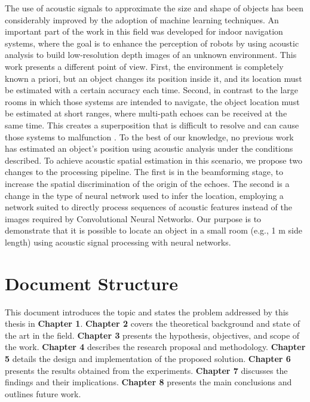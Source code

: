 The use of acoustic signals to approximate the size and shape of objects has been considerably improved by the adoption of machine learning techniques. An important part of the work in this field was developed for indoor navigation systems, where the goal is to enhance the perception of robots by using acoustic analysis to build low-resolution depth images of an unknown environment. This work presents a different point of view. First, the environment is completely known a priori, but an object changes its position inside it, and its location must be estimated with a certain accuracy each time. Second, in contrast to the large rooms in which those systems are intended to navigate, the object location must be estimated at short ranges, where multi-path echoes can be received at the same time. This creates a superposition that is difficult to resolve and can cause those systems to malfunction \cite{bat1}. To the best of our knowledge, no previous work has estimated an object’s position using acoustic analysis under the conditions described. To achieve acoustic spatial estimation in this scenario, we propose two changes to the processing pipeline. The first is in the beamforming stage, to increase the spatial discrimination of the origin of the echoes. The second is a change in the type of neural network used to infer the location, employing a network suited to directly process sequences of acoustic features instead of the images required by Convolutional Neural Networks. Our purpose is to demonstrate that it is possible to locate an object in a small room (e.g., 1 m side length) using acoustic signal processing with neural networks.

\section{Document Structure}

This document introduces the topic and states the problem addressed by this thesis in \textbf{Chapter 1}. \textbf{Chapter 2} covers the theoretical background and state of the art in the field. \textbf{Chapter 3} presents the hypothesis, objectives, and scope of the work. \textbf{Chapter 4} describes the research proposal and methodology. \textbf{Chapter 5} details the design and implementation of the proposed solution. \textbf{Chapter 6} presents the results obtained from the experiments. \textbf{Chapter 7} discusses the findings and their implications. \textbf{Chapter 8} presents the main conclusions and outlines future work.





